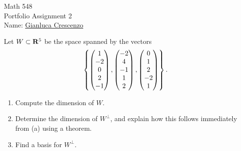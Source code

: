 \documentclass[10pt,twoside,openany]{memoir}
\begin{document}
\begin{center}
    {\Large Math 548 \\[0.1in]Portfolio Assignment 2}\\[.175in]
    {Name:} {\underline{Gianluca Crescenzo\hspace*{2in}}}\\[0.15in]
    \end{center}
    \vspace{4pt}
\begin{problem}[F22, P4]
Let $W \subset \mathbf{R}^5$ be the space spanned by the vectors
    \begin{equation*}
    \begin{split}
        \left\{ \left( \begin{matrix} 1 \\ -2 \\ 0 \\ 2 \\-1 \end{matrix} \right) , \left( \begin{matrix} -2 \\ 4 \\ -1 \\1\\2 \end{matrix} \right), \left( \begin{matrix} 0\\1\\2\\-2\\1\end{matrix} \right)\right\}.
    \end{split}
    \end{equation*}
\begin{enumerate}[label = (\alph*),itemsep=1pt,topsep=3pt]
    \item Compute the dimension of $W$.
    \item Determine the dimension of $W^\perp$, and explain how this follows immediately from (a) using a theorem.
    \item Find a basis for $W^\perp$.
\end{enumerate}
\end{problem}
\end{document}
